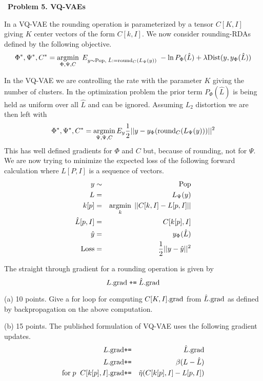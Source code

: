 \documentclass{article}
\newcommand{\solution}[1]{\bigskip {\color{red} {\bf Solution}: #1}}
\begin{document}
\bigskip
~{\bf Problem 5. VQ-VAEs}

In a VQ-VAE the rounding operation is parameterized by a tensor $C[K,I]$ giving $K$ center vectors of the form $C[k,I]$.
We now consider rounding-RDAs defined by the following objective.
$$\Phi^*,\Psi^*,C^* = \operatorname*{argmin}_{\Phi,\Psi,C}\;E_{y \sim \mathrm{Pop},\;\hat{L} :=\mathrm{round}_C(L_\Psi(y))}\;-\ln P_\Phi(\hat{L}) + \lambda\mathrm{Dist}(y,y_\Phi(\hat{L}))$$

In the VQ-VAE we are controlling the rate with the parameter $K$ giving the number of clusters.  In the optimization problem
the prior term $P_\Phi(\hat{L})$ is being held as uniform over all $\hat{L}$ and can be ignored.  Assuming $L_2$ distortion we are then left with
$$\Phi^*,\Psi^*,C^* = \operatorname*{argmin}_{\Psi,\Psi,C} E_y \frac{1}{2}||y - y_\Phi(\mathrm{round}_C(L_\Psi(y)))||^2$$
This has well defined gradients for $\Phi$ and $C$ but, because of rounding, not for $\Psi$.
We are now trying to minimize the expected loss of the following forward calculation where $L[P,I]$ is a sequence of vectors.
\begin{eqnarray*}
  y & \sim & \mathrm{Pop} \\
  L & = & L_\Psi(y) \\
  k[p] & = & \operatorname*{argmin}_k\;||C[k,I] - L[p,I]|| \\
  \hat{L}[p,I] & = & C[k[p],I] \\
  \hat{y} & = & y_\Phi(\hat{L}) \\
  \mathrm{Loss} & = & \frac{1}{2}||y - \hat{y}||^2
\end{eqnarray*}

The straight through gradient for a rounding operation is given by
$$L.\mathrm{grad}\; \mbox{\tt +=} \; \hat{L}.\mathrm{grad}$$

(a) 10 points. Give a for loop for computing $C[K,I].\mathrm{grad}$ from $\hat{L}.\mathrm{grad}$ as defined by backpropagation on the above computation.

\solution{

  $$\mathrm{for}\;p\;\;\;C[k[p],I].\grad \;\pluseq \;\hat{L}[p,I].\grad$$
  
}

(b) 15 points. The published formulation of VQ-VAE uses the following gradient updates.
\begin{eqnarray*}
L.\mathrm{grad} & \mbox{\tt +=} & \hat{L}.\mathrm{grad} \\
L.\mathrm{grad} & \mbox{\tt +=} & \beta(L - \hat{L}) \\
\mathrm{for}\;p\;\;C[k[p],I].\mathrm{grad} & \mbox{\tt +=} & \tilde{\eta}(C[k[p],I] - L[p,I])
\end{eqnarray*}
\end{document}
